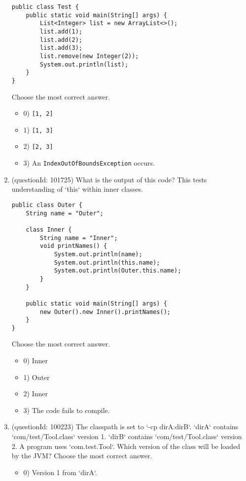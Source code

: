 \documentclass[12pt]{article}
\begin{document}
\begin{enumerate}[label=(\arabic*)]
\begin{verbatim}
public class Test {
    public static void main(String[] args) {
        List<Integer> list = new ArrayList<>();
        list.add(1);
        list.add(2);
        list.add(3);
        list.remove(new Integer(2));
        System.out.println(list);
    }
}
\end{verbatim}
Choose the most correct answer. 
\begin{itemize}
\item 0) \verb|[1, 2]|

\item 1) \verb|[1, 3]|

\item 2) \verb|[2, 3]|

\item 3) An \verb|IndexOutOfBoundsException| occurs.

\end{itemize}
\item (questionId: 101725) What is the output of this code? This tests understanding of `this` within inner classes.\n\begin{verbatim}
public class Outer {
    String name = "Outer";

    class Inner {
        String name = "Inner";
        void printNames() {
            System.out.println(name);
            System.out.println(this.name);
            System.out.println(Outer.this.name);
        }
    }

    public static void main(String[] args) {
        new Outer().new Inner().printNames();
    }
}
\end{verbatim}
Choose the most correct answer. 
\begin{itemize}
\item 0) Inner\nInner\nOuter

\item 1) Outer\nOuter\nOuter

\item 2) Inner\nOuter\nOuter

\item 3) The code fails to compile.

\end{itemize}
\item (questionId: 100223) The classpath is set to `-cp dirA:dirB`. `dirA` contains `com/test/Tool.class` version 1. `dirB` contains `com/test/Tool.class` version 2. A program uses `com.test.Tool`. Which version of the class will be loaded by the JVM?
Choose the most correct answer. 
\begin{itemize}
\item 0) Version 1 from `dirA`.


\end{itemize}
\end{enumerate}
\end{document}
